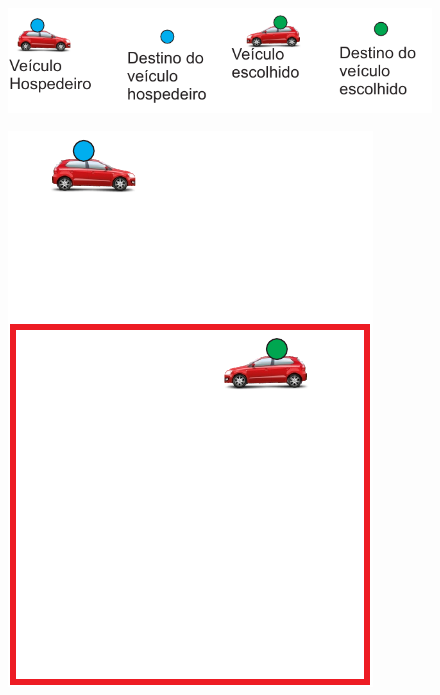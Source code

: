\begin{figure}[htbp]
	\centering
	\includegraphics[scale=0.7]{metodologia/figuras/legendaSelecaoMelhorVeiculo.pdf}
\end{figure}

\begin{figure}[htbp]
	\centering
	\begin{minipage}{0.30\textwidth}
		\centering
		\includegraphics[scale=0.5]{metodologia/figuras/veiculoSelecionadoDentroRA.pdf}
		\label{fig:veiculoSelecionadoDentroRA}
	\end{minipage}%
	\begin{minipage}{0.30\textwidth}
		\centering

\end{minipage}
\end{figure}

